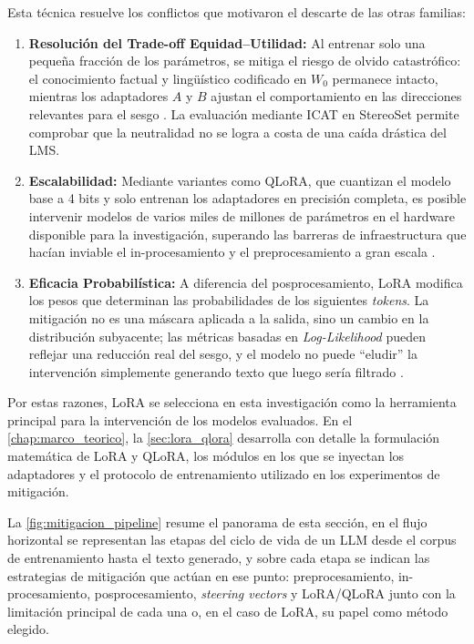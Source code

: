 \documentclass[12pt,a4paper]{report}
\begin{document}
Esta técnica resuelve los conflictos que motivaron el descarte de las otras familias:

\begin{enumerate}
    \item \textbf{Resolución del Trade-off Equidad--Utilidad:} Al entrenar solo una pequeña fracción de los parámetros, se mitiga el riesgo de olvido catastrófico: el conocimiento factual y lingüístico codificado en $W_0$ permanece intacto, mientras los adaptadores $A$ y $B$ ajustan el comportamiento en las direcciones relevantes para el sesgo \cite{raza_developing_2025, hu_lora_2021}. La evaluación mediante ICAT en StereoSet permite comprobar que la neutralidad no se logra a costa de una caída drástica del LMS.
    \item \textbf{Escalabilidad:} Mediante variantes como QLoRA, que cuantizan el modelo base a 4 bits y solo entrenan los adaptadores en precisión completa, es posible intervenir 
    modelos de varios miles de millones de parámetros en el hardware disponible para la investigación, superando las barreras de infraestructura que hacían inviable el in-procesamiento y el preprocesamiento a 
    gran escala \cite{dettmers_qlora_2023}.
    \item \textbf{Eficacia Probabilística:} A diferencia del posprocesamiento, LoRA modifica los pesos que determinan las probabilidades de los siguientes \textit{tokens}. 
    La mitigación no es una máscara aplicada a la salida, sino un cambio en la distribución subyacente; las métricas basadas en \textit{Log-Likelihood} pueden reflejar una 
    reducción real del sesgo, y el modelo no puede ``eludir'' la intervención simplemente generando texto que luego sería filtrado \cite{wang_aligning_2023, raza_developing_2025}.
\end{enumerate}

Por estas razones, LoRA se selecciona en esta investigación como la herramienta principal para la intervención de los modelos evaluados. En el \autoref{chap:marco_teorico}, la \autoref{sec:lora_qlora} desarrolla con detalle la formulación matemática de LoRA y QLoRA, los módulos en los que se inyectan los adaptadores y el protocolo de entrenamiento utilizado en los experimentos de mitigación.

La \autoref{fig:mitigacion_pipeline} resume el panorama de esta sección, en el flujo horizontal se representan las etapas del ciclo de vida de un LLM desde el corpus de entrenamiento hasta el texto generado, 
y sobre cada etapa se indican las estrategias de mitigación que actúan en ese punto: preprocesamiento, in-procesamiento, posprocesamiento, \textit{steering vectors} y LoRA/QLoRA 
junto con la limitación principal de cada una o, en el caso de LoRA, su papel como método elegido.
\end{document}
